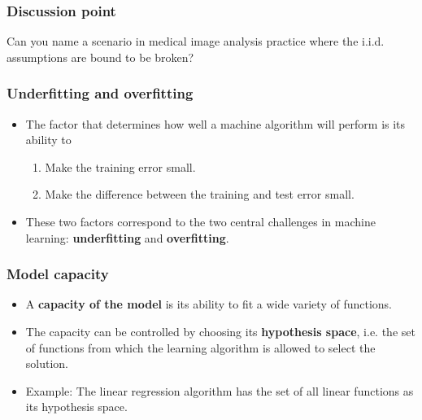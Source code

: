 \documentclass[notes]{beamer}          %
\newif\iffull
\begin{document}
\begin{frame}
\frametitle{Discussion point}
Can you name a scenario in medical image analysis practice where the i.i.d. assumptions are bound to be broken?
\end{frame}


\begin{frame}
\frametitle{Underfitting and overfitting}
    \begin{itemize}
        \item The factor that determines how well a machine algorithm will perform is its ability to
            \begin{enumerate}
                \item Make the training error small.
                \item Make the difference between the training and test error small.
            \end{enumerate}
        \item These two factors correspond to the two central challenges in machine learning: {\bf underfitting} and {\bf overfitting}.
        \iffull
        \item Underfitting occurs when the model is not able to produce a sufficiently small training error.
        \item Overfitting occurs when the gap between the training and test errors is too large.
        \fi
    \end{itemize}
\end{frame}


\begin{frame}
\frametitle{Model capacity}
    \begin{itemize}
        \item A {\bf capacity of the model} is its ability to fit a wide variety of functions.
        \iffull
        \item Low capacity models struggle to fit the training set (underfitting).
        \item Models with high capacity have danger to overfit the training data (e.g., by ``memorizing'' training samples).
        \fi
        \item The capacity can be controlled by choosing its {\bf hypothesis space}, i.e. the set of functions from which the learning algorithm is allowed to select the solution.
        \item Example: The linear regression algorithm has the set of all linear functions as its hypothesis space.

    \end{itemize}
\end{frame}
\end{document}

